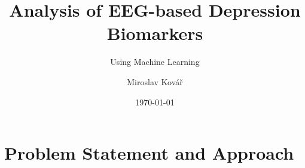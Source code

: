\documentclass{beamer}
\title{Analysis of EEG-based Depression Biomarkers}
\subtitle{Using Machine Learning}
\author{Miroslav Kovář}
\institute{FJFI}
\date{\today}
\begin{document}

\begin{frame}
	\maketitle %
\end{frame}


\section{Problem Statement and Approach} 
\end{document}
